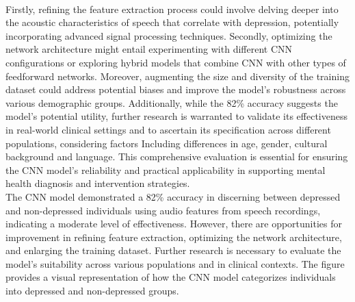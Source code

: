 \\
 Firstly, refining the feature extraction process could involve delving deeper into the acoustic characteristics of speech that correlate with depression, potentially incorporating advanced signal processing techniques. Secondly, optimizing the network architecture might entail experimenting with different CNN configurations or exploring hybrid models that combine CNN with other types of feedforward networks. Moreover, augmenting the size and diversity of the training dataset could address potential biases and improve the model's robustness across various demographic groups. Additionally, while the 82\% accuracy suggests the model's potential utility, further research is warranted to validate its effectiveness in real-world clinical settings and to ascertain its specification across different populations, considering factors Including differences in age, gender, cultural background and language. This comprehensive evaluation is essential for ensuring the CNN model's reliability and practical applicability in supporting mental health diagnosis and intervention strategies.
\\
The CNN model demonstrated a 82\%  accuracy in discerning between depressed and non-depressed individuals using audio features from speech recordings, indicating a moderate level of effectiveness. However, there are opportunities for improvement in refining feature extraction, optimizing the network architecture, and enlarging the training dataset. Further research is necessary to evaluate the model's suitability across various populations and in clinical contexts. The figure provides a visual representation of how the CNN model categorizes individuals into depressed and non-depressed groups.